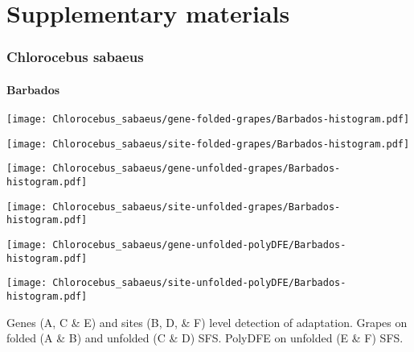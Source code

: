 \documentclass{article}
\begin{document}
\part*{Supplementary materials}
\tableofcontents
 
\pagebreak
\section{Chlorocebus sabaeus}

\subsection{Barbados}
\centering
\begin{minipage}{0.49\linewidth}
    \texttt{[image: Chlorocebus\_sabaeus/gene-folded-grapes/Barbados-histogram.pdf]}
\end{minipage}%
\hfill
\begin{minipage}{0.49\linewidth}
    \texttt{[image: Chlorocebus\_sabaeus/site-folded-grapes/Barbados-histogram.pdf]}
\end{minipage}
\hfill
\begin{minipage}{0.49\linewidth}
    \texttt{[image: Chlorocebus\_sabaeus/gene-unfolded-grapes/Barbados-histogram.pdf]}
\end{minipage}%
\hfill
\begin{minipage}{0.49\linewidth}
    \texttt{[image: Chlorocebus\_sabaeus/site-unfolded-grapes/Barbados-histogram.pdf]}
\end{minipage}
\hfill
\begin{minipage}{0.49\linewidth}
    \texttt{[image: Chlorocebus\_sabaeus/gene-unfolded-polyDFE/Barbados-histogram.pdf]}
\end{minipage}%
\hfill
\begin{minipage}{0.49\linewidth}
    \texttt{[image: Chlorocebus\_sabaeus/site-unfolded-polyDFE/Barbados-histogram.pdf]}
\end{minipage}
\hfill
\flushleft
Genes (A, C \& E) and sites (B, D, \& F) level detection of adaptation.
Grapes on folded (A \& B) and unfolded (C \& D) SFS.
PolyDFE on unfolded (E \& F) SFS.
\end{document}
